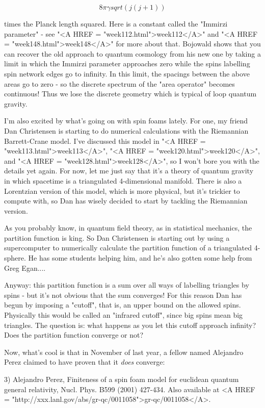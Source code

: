 $$

                8 \pi  \gamma  sqrt(j(j+1))
$$
    
times the Planck length squared.  Here \gamma  is a constant called the
"Immirzi parameter" - see "<A HREF =
"week112.html">week112</A>" and "<A HREF =
"week148.html">week148</A>" for more about that.  Bojowald shows
that you can recover the old approach to quantum cosmology from his new
one by taking a limit in which the Immirzi parameter approaches zero
while the spins labelling spin network edges go to infinity.  In this
limit, the spacings between the above areas go to zero - so the discrete
spectrum of the "area operator" becomes continuous!  Thus we
lose the discrete geometry which is typical of loop quantum gravity.

I'm also excited by what's going on with spin foams lately.  For one, my
friend Dan Christensen is starting to do numerical calculations with the
Riemannian Barrett-Crane model.  I've discussed this model in "<A
HREF = "week113.html">week113</A>", "<A HREF =
"week120.html">week120</A>", and "<A HREF =
"week128.html">week128</A>", so I won't bore you with the details
yet again.  For now, let me just say that it's a theory of quantum
gravity in which spacetime is a triangulated 4-dimensional manifold.
There is also a Lorentzian version of this model, which is more
physical, but it's trickier to compute with, so Dan has wisely decided to
start by tackling the Riemannian version.

As you probably know, in quantum field theory, as in statistical
mechanics, the partition function is king.  So Dan Christensen is
starting out by using a supercomputer to numerically calculate the
partition function of a triangulated 4-sphere.  He has some students
helping him, and he's also gotten some help from Greg Egan.... 

Anyway: this partition function is a sum over all ways of labelling
triangles by spins - but it's not obvious that the sum converges!  For
this reason Dan has begun by imposing a "cutoff", that is, an upper
bound on the allowed spins.  Physically this would be called an
"infrared cutoff", since big spins mean big triangles.  The question 
is: what happens as you let this cutoff approach infinity?  Does the 
partition function converge or not?

Now, what's cool is that in November of last year, a fellow named
Alejandro Perez claimed to have proven that it \emph{does} converge:

3) Alejandro Perez, Finiteness of a spin foam model for euclidean 
quantum general relativity, Nucl. Phys. B599 (2001) 427-434.  
Also available at <A HREF = "http://xxx.lanl.gov/abs/gr-qc/0011058">gr-qc/0011058</A>.

